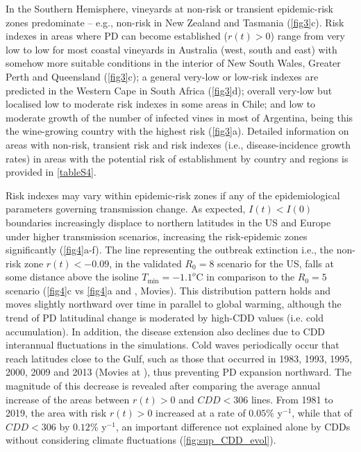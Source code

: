     In the Southern Hemisphere, vineyards at non-risk or transient
    epidemic-risk
    zones predominate -- e.g., non-risk in New Zealand and Tasmania
    (\cref{fig3}c).
    Risk indexes in areas where PD can become established ($r(t) > 0$) range
    from
    very low to low for most coastal vineyards in Australia (west, south and
    east)
    with somehow more suitable conditions in the interior of New South Wales,
    Greater Perth and Queensland (\cref{fig3}c); a general very-low or low-risk
    indexes are predicted in the Western Cape in South Africa (\cref{fig3}d);
    overall very-low but localised low to moderate risk indexes in some areas
    in
    Chile; and low to moderate growth of the number of infected vines in most
    of
    Argentina, being this the wine-growing country with the highest risk
    (\cref{fig3}a). Detailed information on areas with non-risk, transient risk
    and
    risk indexes (i.e., disease-incidence growth rates) in areas with the
    potential
    risk of establishment by country and regions is provided in \cref{tableS4}.

    Risk indexes may vary within epidemic-risk zones if any of the
    epidemiological parameters governing transmission change. As expected,
$I(t) < I(0)$ boundaries increasingly displace to northern latitudes in the US
    and Europe under higher transmission scenarios, increasing the
    risk-epidemic zones significantly (\cref{fig4}a-f). The line representing
    the outbreak extinction i.e., the non-risk zone $r(t)<-0.09$, in the
    validated $R_0=8$ scenario for the US, falls at some distance above the
    isoline $T_{\textrm{min}} = -1.1^o$C in comparison to the $R_0=5$ scenario
    (\cref{fig4}c vs \cref{fig4}a and \cite{Webpage}, Movies). This
    distribution pattern holds and moves slightly northward over time in
    parallel to global warming, although the trend of PD latitudinal change is
    moderated by high-CDD values (i.e. cold accumulation). In addition, the
    disease extension also declines due to CDD interannual fluctuations in the
    simulations. Cold waves periodically occur that reach latitudes close to
    the Gulf, such as those that occurred in 1983, 1993, 1995, 2000, 2009 and
    2013 (Movies at \cite{Webpage}), thus preventing PD expansion northward.
    The magnitude of this decrease is revealed after comparing the average
    annual increase of the areas between $r(t) > 0$ and $CDD < 306$ lines. From
    1981 to 2019, the area with risk $r(t) > 0$ increased at a rate of $0.05\%$
    y$^{-1}$, while that of $CDD < 306$ by $0.12\%$ y$^{-1}$, an important
    difference not explained alone by CDDs without considering climate
    fluctuations (\cref{fig:sup_CDD_evol}).

